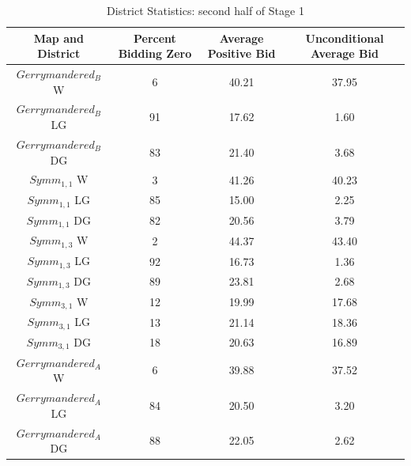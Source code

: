 \documentclass[AER]{AEA}
\begin{document}
\begin{table}
\caption{District Statistics: second half of Stage 1} 
\begin{center}
 \begin{tabular}{|c c c c|} 
 \hline
 Map and District & Percent Bidding Zero & Average Positive Bid & Unconditional Average Bid \\ [0.5ex] 
 \hline
 $Gerrymandered_B$ W & 6 & 40.21 & 37.95 \\
 $Gerrymandered_B$ LG & 91 & 17.62 & 1.60 \\
 $Gerrymandered_B$ DG & 83 & 21.40 & 3.68 \\
  \hline
 $Symm_{1,1}$ W & 3 & 41.26 & 40.23 \\
 $Symm_{1,1}$ LG & 85 & 15.00 & 2.25 \\
 $Symm_{1,1}$ DG & 82 & 20.56 & 3.79 \\
  \hline
 $Symm_{1,3}$ W & 2 & 44.37 & 43.40 \\
 $Symm_{1,3}$ LG & 92 & 16.73 & 1.36 \\
 $Symm_{1,3}$ DG & 89 & 23.81 & 2.68 \\
  \hline
 $Symm_{3,1}$ W & 12 & 19.99 & 17.68 \\
 $Symm_{3,1}$ LG & 13 & 21.14 & 18.36 \\
 $Symm_{3,1}$ DG & 18 & 20.63 & 16.89 \\
  \hline
 $Gerrymandered_A$ W & 6 & 39.88 & 37.52 \\
 $Gerrymandered_A$ LG & 84 & 20.50 & 3.20 \\
 $Gerrymandered_A$ DG & 88 & 22.05 & 2.62 \\
 \hline
\end{tabular}
\label{Tab:all_districts_zero_avg_stage_1_last}
\end{center}
\end{table}
\end{document}
